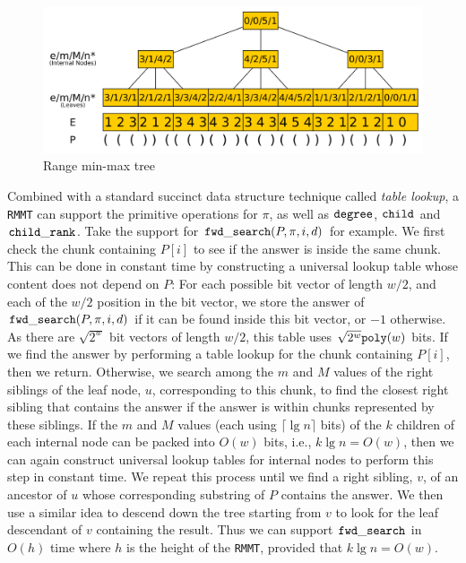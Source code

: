 \begin{figure}[ht]
  \centering
  \includegraphics[scale=0.18]{./images/Range-min-max-tree.png}
  \caption{Range min-max tree}
  \label{fig:RangeMinMaxTree} 
\end{figure}

Combined with a standard succinct data structure technique called {\em table lookup}, a {\tt RMMT} can support the primitive operations for $\pi$, as well as $\mathtt{degree}$, $\mathtt{child}$ and $\mathtt{child\_rank}$. 
Take the support for $\mathtt{fwd\_search}(P,\pi,i,d)$ for example. 
We first check the chunk containing $P[i]$ to see if the answer is inside the same chunk. 
This can be done in constant time by constructing a universal lookup table whose content does not depend on $P$: For each possible bit vector of length $w/2$, and each of the $w/2$ position in the bit vector, we store the answer of $\mathtt{fwd\_search}(P,\pi,i,d)$ if it can be found inside this bit vector, or $-1$ otherwise. As there are $\sqrt{2^w}$ bit vectors of length $w/2$, this table uses $\sqrt{2^w}\mathtt{poly}(w)$ bits. 
If we find the  answer by performing a table lookup for the chunk containing $P[i]$, then we return. 
Otherwise, we search among the $m$ and $M$ values of the right siblings of the leaf node, $u$, corresponding to this chunk, to find the closest right sibling that contains the answer if the answer is within chunks represented by these siblings. 
If the $m$ and $M$ values (each using $\lceil\lg n\rceil$ bits) of the $k$ children of each internal node can be packed into $O(w)$ bits, i.e., $k \lg n = O(w)$, then we can again construct universal lookup tables for internal nodes to perform this step in constant time. 
We repeat this process until we find a right sibling, $v$, of an ancestor of $u$ whose corresponding substring of $P$ contains the answer. 
We then use a similar idea to descend down the tree starting from $v$ to look for the leaf descendant of $v$ containing the result. 
Thus we can support $\mathtt{fwd\_search}$ in $O(h)$ time where $h$ is the height of the {\tt RMMT}, provided that $k \lg n = O(w)$. 

